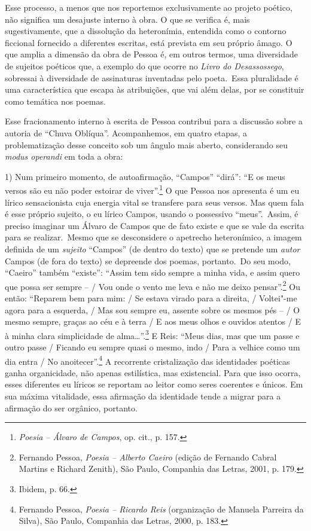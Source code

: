 Esse processo, a menos que nos reportemos exclusivamente ao projeto
poético, não significa um desajuste interno à obra. O que se verifica é,
mais sugestivamente, que a dissolução da heteronímia, entendida como o
contorno ficcional fornecido a diferentes escritas, está prevista em seu
próprio âmago. O que amplia a dimensão da obra de Pessoa é, em outros
termos, uma diversidade de sujeitos poéticos que, a exemplo do que
ocorre no \emph{Livro do Desassossego}, sobressai à diversidade de
assinaturas inventadas pelo poeta.~Essa pluralidade é uma característica
que escapa às atribuições, que vai além delas, por se constituir como
temática nos poemas.

Esse fracionamento interno à escrita de Pessoa contribui para a
discussão sobre a autoria de ``Chuva Oblíqua''. Acompanhemos, em quatro
etapas, a problematização desse conceito sob um ângulo mais aberto,
considerando seu \emph{modus operandi} em toda a obra:

1) Num primeiro momento, de autoafirmação, ``Campos'' ``dirá'': ``E os
meus versos são eu não poder estoirar de viver''.\footnote{\emph{Poesia
  -- Álvaro de Campos}, op. cit., p. 157.} O que Pessoa nos apresenta é
um eu lírico sensacionista cuja energia vital se transfere para seus
versos. Mas quem fala é esse próprio sujeito, o eu lírico Campos, usando
o possessivo ``meus''.~Assim, é preciso imaginar um Álvaro de Campos que
de fato existe e que se vale da escrita para se realizar.~Mesmo que se
desconsidere o apetrecho heteronímico, a imagem definida de um
\emph{sujeito} ``Campos'' (de dentro do texto) que se pretende um
\emph{autor} Campos (de fora do texto) se depreende dos poemas,
portanto.~Do seu modo, ``Caeiro'' também ``existe'': ``Assim tem sido
sempre a minha vida, e assim quero que possa ser sempre -- / Vou onde o
vento me leva e não me deixo pensar''.\footnote{Fernando Pessoa,
  \emph{Poesia -- Alberto Caeiro} (edição de Fernando Cabral Martins e
  Richard Zenith), São Paulo, Companhia das Letras, 2001, p. 179.} Ou
então: ``Reparem bem para mim: / Se estava virado para a direita, /
Voltei"-me agora para a esquerda, / Mas sou sempre eu, assente sobre os
mesmos pés -- / O mesmo sempre, graças ao céu e à terra / E aos meus
olhos e ouvidos atentos / E à minha clara simplicidade de
alma\ldots{}''.\footnote{Ibidem, p. 66.} E Reis: ``Meus dias, mas que um
passe e outro passe / Ficando eu sempre quasi o mesmo, indo / Para a
velhice como um dia entra / No anoitecer''.\footnote{Fernando Pessoa,
  \emph{Poesia -- Ricardo Reis} (organização de Manuela Parreira da
  Silva), São Paulo, Companhia das Letras, 2000, p. 183.} A recorrente
cristalização das identidades poéticas ganha organicidade, não apenas
estilística, mas existencial. Para que isso ocorra, esses diferentes eu
líricos se reportam ao leitor como seres coerentes e únicos. Em sua
máxima vitalidade, essa afirmação da identidade tende a migrar para a
afirmação do ser orgânico, portanto.

